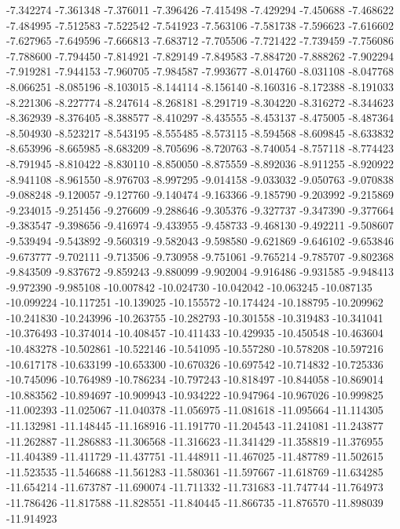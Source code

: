 -7.342274
-7.361348
-7.376011
-7.396426
-7.415498
-7.429294
-7.450688
-7.468622
-7.484995
-7.512583
-7.522542
-7.541923
-7.563106
-7.581738
-7.596623
-7.616602
-7.627965
-7.649596
-7.666813
-7.683712
-7.705506
-7.721422
-7.739459
-7.756086
-7.788600
-7.794450
-7.814921
-7.829149
-7.849583
-7.884720
-7.888262
-7.902294
-7.919281
-7.944153
-7.960705
-7.984587
-7.993677
-8.014760
-8.031108
-8.047768
-8.066251
-8.085196
-8.103015
-8.144114
-8.156140
-8.160316
-8.172388
-8.191033
-8.221306
-8.227774
-8.247614
-8.268181
-8.291719
-8.304220
-8.316272
-8.344623
-8.362939
-8.376405
-8.388577
-8.410297
-8.435555
-8.453137
-8.475005
-8.487364
-8.504930
-8.523217
-8.543195
-8.555485
-8.573115
-8.594568
-8.609845
-8.633832
-8.653996
-8.665985
-8.683209
-8.705696
-8.720763
-8.740054
-8.757118
-8.774423
-8.791945
-8.810422
-8.830110
-8.850050
-8.875559
-8.892036
-8.911255
-8.920922
-8.941108
-8.961550
-8.976703
-8.997295
-9.014158
-9.033032
-9.050763
-9.070838
-9.088248
-9.120057
-9.127760
-9.140474
-9.163366
-9.185790
-9.203992
-9.215869
-9.234015
-9.251456
-9.276609
-9.288646
-9.305376
-9.327737
-9.347390
-9.377664
-9.383547
-9.398656
-9.416974
-9.433955
-9.458733
-9.468130
-9.492211
-9.508607
-9.539494
-9.543892
-9.560319
-9.582043
-9.598580
-9.621869
-9.646102
-9.653846
-9.673777
-9.702111
-9.713506
-9.730958
-9.751061
-9.765214
-9.785707
-9.802368
-9.843509
-9.837672
-9.859243
-9.880099
-9.902004
-9.916486
-9.931585
-9.948413
-9.972390
-9.985108
-10.007842
-10.024730
-10.042042
-10.063245
-10.087135
-10.099224
-10.117251
-10.139025
-10.155572
-10.174424
-10.188795
-10.209962
-10.241830
-10.243996
-10.263755
-10.282793
-10.301558
-10.319483
-10.341041
-10.376493
-10.374014
-10.408457
-10.411433
-10.429935
-10.450548
-10.463604
-10.483278
-10.502861
-10.522146
-10.541095
-10.557280
-10.578208
-10.597216
-10.617178
-10.633199
-10.653300
-10.670326
-10.697542
-10.714832
-10.725336
-10.745096
-10.764989
-10.786234
-10.797243
-10.818497
-10.844058
-10.869014
-10.883562
-10.894697
-10.909943
-10.934222
-10.947964
-10.967026
-10.999825
-11.002393
-11.025067
-11.040378
-11.056975
-11.081618
-11.095664
-11.114305
-11.132981
-11.148445
-11.168916
-11.191770
-11.204543
-11.241081
-11.243877
-11.262887
-11.286883
-11.306568
-11.316623
-11.341429
-11.358819
-11.376955
-11.404389
-11.411729
-11.437751
-11.448911
-11.467025
-11.487789
-11.502615
-11.523535
-11.546688
-11.561283
-11.580361
-11.597667
-11.618769
-11.634285
-11.654214
-11.673787
-11.690074
-11.711332
-11.731683
-11.747744
-11.764973
-11.786426
-11.817588
-11.828551
-11.840445
-11.866735
-11.876570
-11.898039
-11.914923
